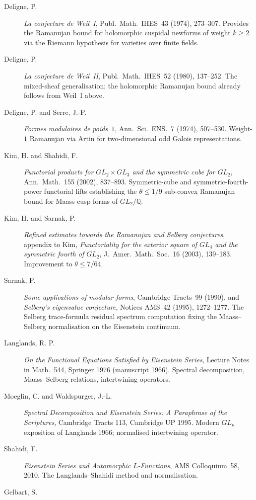 \begin{description}
\item[Deligne, P.]
\emph{La conjecture de Weil~I}, Publ.~Math.~IHES~43 (1974), 273--307.
Provides the Ramanujan bound for holomorphic cuspidal newforms of
weight \(k\geq 2\) via the Riemann hypothesis for varieties over finite
fields.
\item[Deligne, P.]
\emph{La conjecture de Weil~II}, Publ.~Math.~IHES~52 (1980), 137--252.
The mixed-sheaf generalisation; the holomorphic Ramanujan bound already
follows from Weil~I above.
\item[Deligne, P. and Serre, J.-P.]
\emph{Formes modulaires de poids~\(1\)}, Ann.~Sci.~ENS.~7 (1974), 507--530.
Weight-\(1\) Ramanujan via Artin for two-dimensional odd Galois
representations.
\item[Kim, H. and Shahidi, F.]
\emph{Functorial products for \(GL_{2}\times GL_{3}\) and the symmetric
cube for \(GL_{2}\)}, Ann.~Math.~155 (2002), 837--893. Symmetric-cube
and symmetric-fourth-power functorial lifts establishing the
\(\theta\leq 1/9\) sub-convex Ramanujan bound for Maass cusp forms of
\(GL_{2}/\mathbb{Q}\).
\item[Kim, H. and Sarnak, P.]
\emph{Refined estimates towards the Ramanujan and Selberg conjectures},
appendix to Kim, \emph{Functoriality for the exterior square of
\(GL_{4}\) and the symmetric fourth of \(GL_{2}\)}, J.~Amer.~Math.~Soc.~16
(2003), 139--183. Improvement to \(\theta\leq 7/64\).
\item[Sarnak, P.]
\emph{Some applications of modular forms}, Cambridge Tracts~99 (1990),
and \emph{Selberg's eigenvalue conjecture}, Notices AMS~42 (1995),
1272--1277. The Selberg trace-formula residual spectrum computation
fixing the Maass--Selberg normalisation on the Eisenstein continuum.
\item[Langlands, R. P.]
\emph{On the Functional Equations Satisfied by Eisenstein Series},
Lecture Notes in Math.~544, Springer 1976 (manuscript 1966).
Spectral decomposition, Maass--Selberg relations, intertwining
operators.
\item[Moeglin, C. and Waldspurger, J.-L.]
\emph{Spectral Decomposition and Eisenstein Series: A Paraphrase of
the Scriptures}, Cambridge Tracts 113, Cambridge UP 1995. Modern
\(GL_{n}\) exposition of Langlands 1966; normalised intertwining
operator.
\item[Shahidi, F.]
\emph{Eisenstein Series and Automorphic \(L\)-Functions}, AMS
Colloquium~58, 2010. The Langlands--Shahidi method and
normalisation.
\item[Gelbart, S.]

\end{description}
